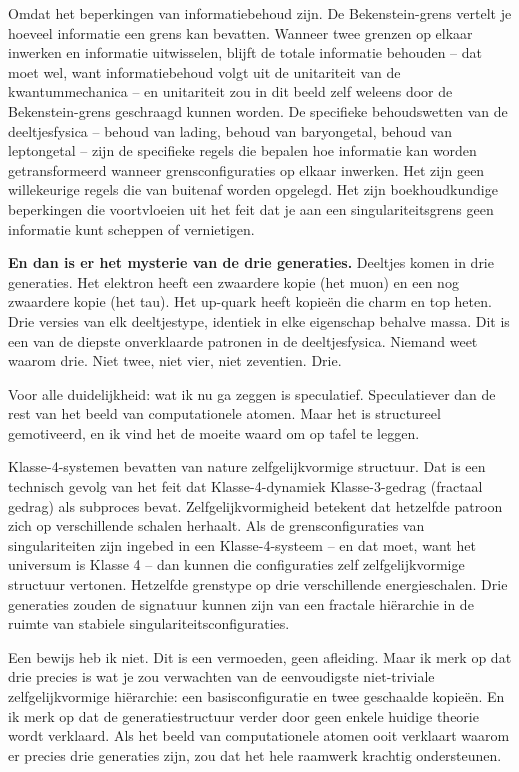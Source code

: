 \documentclass[11pt, twoside, openright]{book}
\begin{document}
Omdat het beperkingen van informatiebehoud zijn. De Bekenstein-grens vertelt je hoeveel informatie een grens kan bevatten. Wanneer twee grenzen op elkaar inwerken en informatie uitwisselen, blijft de totale informatie behouden -- dat moet wel, want informatiebehoud volgt uit de unitariteit van de kwantummechanica -- en unitariteit zou in dit beeld zelf weleens door de Bekenstein-grens geschraagd kunnen worden. De specifieke behoudswetten van de deeltjesfysica -- behoud van lading, behoud van baryongetal, behoud van leptongetal -- zijn de specifieke regels die bepalen hoe informatie kan worden getransformeerd wanneer grensconfiguraties op elkaar inwerken. Het zijn geen willekeurige regels die van buitenaf worden opgelegd. Het zijn boekhoudkundige beperkingen die voortvloeien uit het feit dat je aan een singulariteitsgrens geen informatie kunt scheppen of vernietigen.

\textbf{En dan is er het mysterie van de drie generaties.} Deeltjes komen in drie generaties. Het elektron heeft een zwaardere kopie (het muon) en een nog zwaardere kopie (het tau). Het up-quark heeft kopieën die charm en top heten. Drie versies van elk deeltjestype, identiek in elke eigenschap behalve massa. Dit is een van de diepste onverklaarde patronen in de deeltjesfysica. Niemand weet waarom drie. Niet twee, niet vier, niet zeventien. Drie.

Voor alle duidelijkheid: wat ik nu ga zeggen is speculatief. Speculatiever dan de rest van het beeld van computationele atomen. Maar het is structureel gemotiveerd, en ik vind het de moeite waard om op tafel te leggen.

Klasse-4-systemen bevatten van nature zelfgelijkvormige structuur. Dat is een technisch gevolg van het feit dat Klasse-4-dynamiek Klasse-3-gedrag (fractaal gedrag) als subproces bevat. Zelfgelijkvormigheid betekent dat hetzelfde patroon zich op verschillende schalen herhaalt. Als de grensconfiguraties van singulariteiten zijn ingebed in een Klasse-4-systeem -- en dat moet, want het universum is Klasse 4 -- dan kunnen die configuraties zelf zelfgelijkvormige structuur vertonen. Hetzelfde grenstype op drie verschillende energieschalen. Drie generaties zouden de signatuur kunnen zijn van een fractale hiërarchie in de ruimte van stabiele singulariteitsconfiguraties.

Een bewijs heb ik niet. Dit is een vermoeden, geen afleiding. Maar ik merk op dat drie precies is wat je zou verwachten van de eenvoudigste niet-triviale zelfgelijkvormige hiërarchie: een basisconfiguratie en twee geschaalde kopieën. En ik merk op dat de generatiestructuur verder door geen enkele huidige theorie wordt verklaard. Als het beeld van computationele atomen ooit verklaart waarom er precies drie generaties zijn, zou dat het hele raamwerk krachtig ondersteunen.
\end{document}
